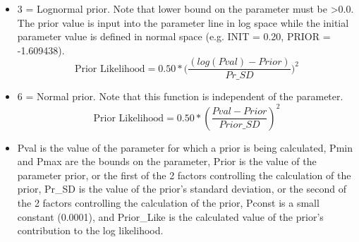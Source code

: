 \begin{itemize}
	\item 3 = Lognormal prior.  Note that lower bound on the parameter must be >0.0. The prior value is input into the parameter line in log space while the initial parameter value is defined in normal space (e.g. INIT = 0.20, PRIOR = -1.609438).
	\begin{equation}
	\text{Prior Likelihood} = 0.50*\Big(\frac{(log(Pval)-Prior)}{Pr\_SD}\Big)^2
	\end{equation}
	\item  6 = Normal prior. Note that this function is independent of the parameter.
		\begin{equation}
		\text{Prior Likelihood} = 0.50*(\frac{Pval - Prior}{Prior\_SD})^2
		\end{equation}
	\item Pval is the value of the parameter for which a prior is being calculated, Pmin and Pmax are the bounds on the parameter, Prior is the value of the parameter prior, or the first of the 2 factors controlling the calculation of the prior, Pr\_SD is the value of the prior's standard deviation, or the second of the 2 factors controlling the calculation of the prior, Pconst is a small constant (0.0001), and Prior\_Like is the calculated value of the prior's contribution to the log likelihood.
\end{itemize}
